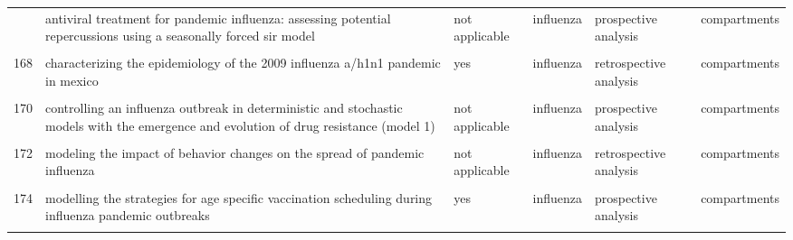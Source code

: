 \documentclass[
]{article}
\begin{document}
\begin{landscape}
\begin{longtable}{l>{\raggedright\arraybackslash}p{3.3cm}l>{\raggedright\arraybackslash}p{3.3cm}>{\raggedright\arraybackslash}p{2cm}l}
\addlinespace
166 & antiviral treatment for pandemic influenza: assessing potential repercussions using a seasonally forced sir model & not applicable & influenza & prospective analysis & compartments\\
\cellcolor{gray!6}{167} & \cellcolor{gray!6}{can antiviral drugs contain pandemic influenza transmission?} & \cellcolor{gray!6}{not applicable} & \cellcolor{gray!6}{influenza} & \cellcolor{gray!6}{prospective analysis} & \cellcolor{gray!6}{compartments}\\
168 & characterizing the epidemiology of the 2009 influenza a/h1n1 pandemic in mexico & yes & influenza & retrospective analysis & compartments\\
\cellcolor{gray!6}{169} & \cellcolor{gray!6}{cholera epidemic in haiti, 2010: using a transmission model to explain spatial spread of disease and identify optimal control interventions} & \cellcolor{gray!6}{no} & \cellcolor{gray!6}{cholera} & \cellcolor{gray!6}{retrospective analysis} & \cellcolor{gray!6}{compartments}\\
170 & controlling an influenza outbreak in deterministic and stochastic models with the emergence and evolution of drug resistance (model 1) & not applicable & influenza & prospective analysis & compartments\\
\addlinespace
\cellcolor{gray!6}{171} & \cellcolor{gray!6}{modeling control strategies for concurrent epidemics of seasonal and pandemic h1n1 influenza} & \cellcolor{gray!6}{yes} & \cellcolor{gray!6}{influenza} & \cellcolor{gray!6}{prospective analysis} & \cellcolor{gray!6}{compartments}\\
172 & modeling the impact of behavior changes on the spread of pandemic influenza & not applicable & influenza & retrospective analysis & compartments\\
\cellcolor{gray!6}{173} & \cellcolor{gray!6}{modelling and analysis of influenza a (h1n1) on networks} & \cellcolor{gray!6}{yes} & \cellcolor{gray!6}{influenza} & \cellcolor{gray!6}{prospective analysis} & \cellcolor{gray!6}{compartments}\\
174 & modelling the strategies for age specific vaccination scheduling during influenza pandemic outbreaks & yes & influenza & prospective analysis & compartments\\
\cellcolor{gray!6}{175} & \cellcolor{gray!6}{modelling the transmission dynamics and control of the novel 2009 swine influenza (h1n1) pandemic} & \cellcolor{gray!6}{yes} & \cellcolor{gray!6}{influenza} & \cellcolor{gray!6}{prospective analysis} & \cellcolor{gray!6}{compartments}\\

\end{longtable}
\end{landscape}
\end{document}

